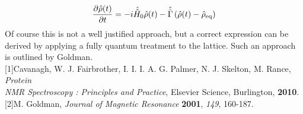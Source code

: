 \begin{appendixtext}
\begin{equation}
\label{eqA.21}
\pdv{\hat{\rho} (t)}{t} = -i \hat{\hat{H}}_0 \hat{\rho} (t) - \hat{\hat{\Gamma}} \left(\hat{\rho} (t) - \hat{\rho}_{\text{eq}} \right)
\end{equation}
Of course this is not a well justified approach, but a correct expression can be derived by applying a fully quantum treatment to the lattice. Such an approach is outlined by Goldman.\\ 

\small
\noindent
{[1]}\quad Cavanagh, W. J. Fairbrother, I. I. I. A. G. Palmer, N. J. Skelton, M. Rance, \textit{Protein}\\
\textit{\null\hspace{20pt} NMR Spectroscopy : Principles and Practice}, Elsevier Science, Burlington, \textbf{2010}.\\
{[2]}\quad M. Goldman, \textit{Journal of Magnetic Resonance} \textbf{2001}, \textit{149}, 160-187.
\singlespacing
\end{appendixtext}
